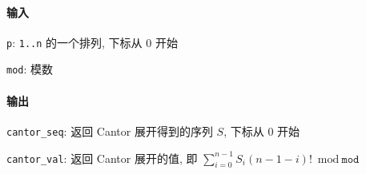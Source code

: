 \paragraph{输入}

\verb|p|: \verb|1..n| 的一个排列, 下标从 \(0\) 开始

\verb|mod|: 模数

\paragraph{输出}

\verb|cantor_seq|: 返回 Cantor 展开得到的序列 \(S\), 下标从 \(0\) 开始

\verb|cantor_val|: 返回 Cantor 展开的值, 即 \(\sum_{i=0}^{n-1}S_i(n-1-i)!\bmod \texttt{mod}\)
